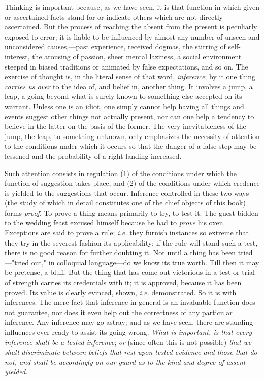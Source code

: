 \documentclass[showtrims,ustradepaper]{memoir}
\begin{document}
Thinking is important because, as we have seen, it is that function in
which given or ascertained facts stand for or indicate others which are
not directly ascertained. But the process of reaching the absent from
the present is peculiarly exposed to error; it is liable to be
influenced by almost any number of unseen and unconsidered
causes,---past experience, received dogmas, the stirring of
self-interest, the arousing of passion, sheer mental laziness, a social
environment steeped in biased traditions or animated by false
expectations, and so on. The exercise of thought is, in the literal
sense of that word, \emph{inference}; by it one thing \emph{carries us
over} to the idea of, and belief in, another thing. It involves a jump,
a leap, a going beyond what is surely known to something else accepted
on its warrant. Unless one is an idiot, one simply cannot help having
all things and events suggest other things not actually present, nor can
one help a tendency to believe in the latter on the basis of the former.
The very inevitableness of the jump, the leap, to something unknown,
only emphasizes the necessity of attention to the conditions under which
it occurs so that the danger of a false step may be lessened and the
probability of a right landing
increased.


Such attention consists in regulation (1) of the conditions under which
the function of suggestion takes place, and (2) of the conditions under
which credence is yielded to the suggestions that occur. Inference
controlled in these two ways (the study of which in detail constitutes
one of the chief objects of this book) forms \emph{proof}. To prove a
thing means primarily to try, to test it. The guest bidden to the
wedding feast excused himself because he had to \emph{prove} his oxen.
Exceptions are said to prove a rule; \emph{i.e.} they furnish instances
so extreme that they try in the severest fashion its applicability; if
the rule will stand such a test, there is no good reason for further
doubting it. Not until a thing has been tried---"tried out," in
colloquial language---do we know its true worth. Till then it may be
pretense, a bluff. But the thing that has come out victorious in a test
or trial of strength carries its credentials with it; it is approved,
because it has been proved. Its value is clearly evinced, shown,
\emph{i.e.} demonstrated. So it is with inferences. The mere fact that
inference in general is an invaluable function does not guarantee, nor
does it even help out the correctness of any particular inference. Any
inference may go astray; and as we have seen, there are standing
influences ever ready to assist its going wrong. \emph{What is
important, is that every inference shall be a tested inference};
\emph{or} (since often this is not possible) \emph{that we shall
discriminate between beliefs that rest upon tested evidence and those
that do not, and shall be accordingly on our guard as to the kind and
degree of assent yielded}.
\end{document}
